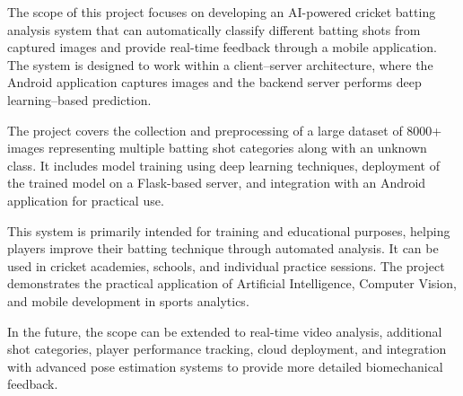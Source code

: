 The scope of this project focuses on developing an AI-powered cricket batting analysis system that can automatically classify different batting shots from captured images and provide real-time feedback through a mobile application. The system is designed to work within a client–server architecture, where the Android application captures images and the backend server performs deep learning–based prediction.

The project covers the collection and preprocessing of a large dataset of 8000+ images representing multiple batting shot categories along with an unknown class. It includes model training using deep learning techniques, deployment of the trained model on a Flask-based server, and integration with an Android application for practical use.

This system is primarily intended for training and educational purposes, helping players improve their batting technique through automated analysis. It can be used in cricket academies, schools, and individual practice sessions. The project demonstrates the practical application of Artificial Intelligence, Computer Vision, and mobile development in sports analytics.

In the future, the scope can be extended to real-time video analysis, additional shot categories, player performance tracking, cloud deployment, and integration with advanced pose estimation systems to provide more detailed biomechanical feedback.

\clearpage


